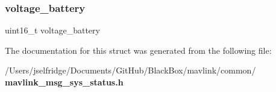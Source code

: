 \mbox{\label{struct____mavlink__sys__status__t_a4aa8874cd39f2ea203ea08f52ea2810b}} 
\subsubsection{voltage\+\_\+battery}
{\footnotesize\ttfamily uint16\+\_\+t voltage\+\_\+battery}



The documentation for this struct was generated from the following file\+:\begin{DoxyCompactItemize}
\item 
/\+Users/jselfridge/\+Documents/\+Git\+Hub/\+Black\+Box/mavlink/common/\textbf{ mavlink\+\_\+msg\+\_\+sys\+\_\+status.\+h}\end{DoxyCompactItemize}
